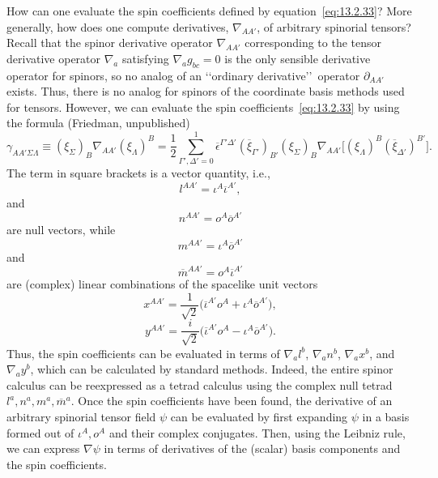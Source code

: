 How can one evaluate the spin coefficients defined by equation~\eqref{eq:13.2.33}?
More generally, how does one compute derivatives, \(\nabla_{AA'}\), of arbitrary
spinorial tensors? Recall that the spinor derivative operator \(\nabla_{AA'}\)
corresponding to the tensor derivative operator \(\nabla_a\) satisfying
\(\nabla_a g_{bc}=0\) is the only sensible derivative operator for spinors, so no
analog of an \lq\lq ordinary derivative\rq\rq\ operator \(\partial_{AA'}\) exists.
Thus, there is no analog for spinors of the coordinate basis methods used for
tensors. However, we can
evaluate the spin coefficients~\eqref{eq:13.2.33} by using the formula (Friedman,
unpublished)
\begin{equation}
  \gamma_{AA'\Sigma\Lambda}
  \equiv(\xi_\Sigma)_B\nabla_{AA'}(\xi_\Lambda)^B
  =\frac12\sum_{\Gamma',\Delta'=0}^1
    \overline\epsilon^{\Gamma'\Delta'}(\overline\xi_{\Gamma'})_{B'}
    (\xi_\Sigma)_B\nabla_{AA'}
    \bigl[(\xi_\Lambda)^B(\overline\xi_{\Delta'})^{B'}\bigr].
  \tag{13.2.34}\label{eq:13.2.34}
\end{equation}
The term in square brackets is a vector quantity, i.e.,
\begin{equation}
  l^{AA'}=\iota^A\overline\iota^{A'},
  \tag{13.2.35}\label{eq:13.2.35}
\end{equation}
and
\begin{equation}
  n^{AA'}=o^A\overline o^{A'}
  \tag{13.2.36}\label{eq:13.2.36}
\end{equation}
are null vectors, while
\begin{equation}
  m^{AA'}=\iota^A\overline o^{A'}
  \tag{13.2.37}\label{eq:13.2.37}
\end{equation}
and
\begin{equation}
  \overline m^{AA'}=o^A\overline\iota^{A'}
  \tag{13.2.38}\label{eq:13.2.38}
\end{equation}
are (complex) linear combinations of the spacelike unit vectors
\begin{equation}
  x^{AA'}=\frac{1}{\sqrt2}
    \bigl(\overline\iota^{A'}o^A+\iota^A\overline o^{A'}\bigr),
  \tag{13.2.39}\label{eq:13.2.39}
\end{equation}
\begin{equation}
  y^{AA'}=\frac{i}{\sqrt2}
    \bigl(\overline\iota^{A'}o^A-\iota^A\overline o^{A'}\bigr).
  \tag{13.2.40}\label{eq:13.2.40}
\end{equation}
Thus, the spin coefficients can be evaluated in terms of
\(\nabla_a l^b\), \(\nabla_a n^b\), \(\nabla_a x^b\), and \(\nabla_a y^b\), which
can be calculated by standard methods. Indeed, the entire spinor calculus can be
reexpressed as a tetrad calculus using the complex null tetrad
\(l^a,n^a,m^a,\overline m^a\). Once the spin coefficients have been found, the
derivative of an arbitrary spinorial tensor field \(\psi\) can be evaluated by first
expanding \(\psi\) in a basis formed out of \(\iota^A,o^A\) and their complex
conjugates. Then, using the Leibniz rule, we can express \(\nabla\psi\) in terms of
derivatives of the (scalar) basis components and the spin coefficients.


